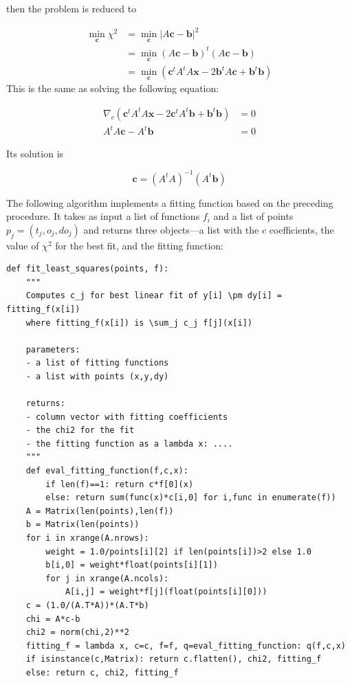 \documentclass[justified,sixbynine]{tufte-book}
\def\ft{\small\tt}
\theoremstyle{plain}%
\theoremstyle{definition}
\theoremstyle{remark}
\begin{document}
\begin{fullwidth}
then the problem is reduced to

\begin{align}
\min_{\mathbf{c}}\chi^2 &= \min_{\mathbf{c}} |A\mathbf{c}-\mathbf{b}|^2 \\
  &= \min_{\mathbf{c}} (A\mathbf{c}-\mathbf{b})^t (A\mathbf{c}-\mathbf{b}) \\
  &= \min_{\mathbf{c}} (\mathbf{c}^t A^t A \mathbf x - 2\mathbf{b}^t A \mathbf{c} + \mathbf{b}^t \mathbf{b})
\end{align}
This is the same as solving the following equation:

\begin{align}
\nabla_{c} (\mathbf{c}^t A^t A \mathbf x - 2\mathbf{c}^t A^t \mathbf{b} + \mathbf{b}^t\mathbf{b}) &= 0 \\
A^t A \mathbf{c} - A^t \mathbf{b} &= 0
\end{align}

Its solution is

\begin{equation}
\mathbf{c} = (A^t A)^{-1} (A^t \mathbf{b})
\end{equation}

The following algorithm implements a fitting function based on the preceding procedure. It takes as input a list of functions $f_i$ and a list of points $p_j=(t_j,o_j,do_j)$ and returns three objects---a list with the $c$ coefficients, the value of $\chi^2$ for the best fit, and the fitting function:

\begin{lstlisting}[caption={in file: {\ft nlib.py}}]
def fit_least_squares(points, f):
    """
    Computes c_j for best linear fit of y[i] \pm dy[i] = fitting_f(x[i])
    where fitting_f(x[i]) is \sum_j c_j f[j](x[i])

    parameters:
    - a list of fitting functions
    - a list with points (x,y,dy)

    returns:
    - column vector with fitting coefficients
    - the chi2 for the fit
    - the fitting function as a lambda x: ....
    """
    def eval_fitting_function(f,c,x):
        if len(f)==1: return c*f[0](x)
        else: return sum(func(x)*c[i,0] for i,func in enumerate(f))
    A = Matrix(len(points),len(f))
    b = Matrix(len(points))
    for i in xrange(A.nrows):
        weight = 1.0/points[i][2] if len(points[i])>2 else 1.0
        b[i,0] = weight*float(points[i][1])
        for j in xrange(A.ncols):
            A[i,j] = weight*f[j](float(points[i][0]))
    c = (1.0/(A.T*A))*(A.T*b)
    chi = A*c-b
    chi2 = norm(chi,2)**2
    fitting_f = lambda x, c=c, f=f, q=eval_fitting_function: q(f,c,x)
    if isinstance(c,Matrix): return c.flatten(), chi2, fitting_f
    else: return c, chi2, fitting_f


\end{lstlisting}
\end{fullwidth}
\end{document}
